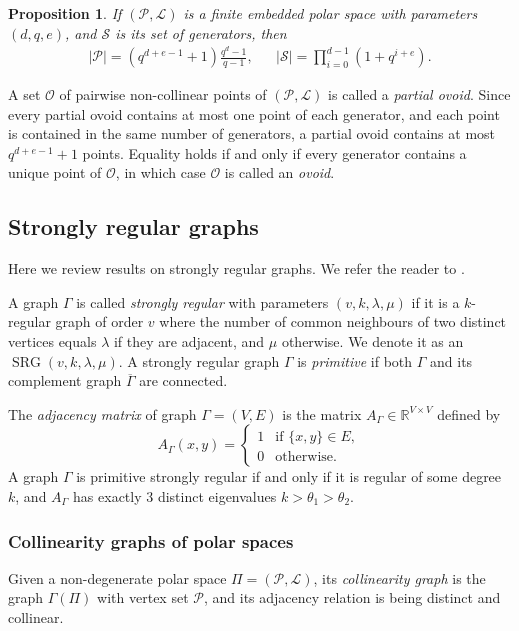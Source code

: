 \documentclass[a4paper]{article}
\newtheorem{prop}[thm]{Proposition}
\theoremstyle{definition}
\newcommand{\RR}{\mathbb R}
\newcommand{\ml}{\mathcal L}
\newcommand{\mo}{\mathcal O}
\renewcommand{\mp}{\mathcal P}
\newcommand{\ms}{\mathcal S}
\DeclareMathOperator{\SRG}{SRG}
\begin{document}
\begin{prop}
 If $(\mp,\ml)$ is a finite embedded polar space with parameters $(d,q,e)$, and $\ms$ is its set of generators, then
 \begin{align*}
  |\mp| = (q^{d+e-1}+1) \frac{q^d - 1}{q-1}, &&
  |\ms| = \prod_{i=0}^{d-1} (1+q^{i+e}).
 \end{align*}
\end{prop}

A set $\mo$ of pairwise non-collinear points of $(\mp,\ml)$ is called a \emph{partial ovoid}.
Since every partial ovoid contains at most one point of each generator, and each point is contained in the same number of generators, a partial ovoid contains at most $q^{d+e-1} + 1$ points.
Equality holds if and only if every generator contains a unique point of $\mo$, in which case $\mo$ is called an \emph{ovoid}.

\subsection{Strongly regular graphs}

Here we review results on strongly regular graphs.
We refer the reader to \cite{Brouwer:VanMaldeghem}.

A graph $\Gamma$ is called \emph{strongly regular} with parameters $(v,k,\lambda,\mu)$ if it is a $k$-regular graph of order $v$ where the number of common neighbours of two distinct vertices equals $\lambda$ if they are adjacent, and $\mu$ otherwise.
We denote it as an $\SRG(v,k,\lambda,\mu)$.
A strongly regular graph $\Gamma$ is \emph{primitive} if both $\Gamma$ and its complement graph $\overline \Gamma$ are connected.

The \emph{adjacency matrix} of graph $\Gamma = (V,E)$ is the matrix $A_\Gamma \in \RR^{V \times V}$ defined by
\[
 A_\Gamma(x,y) = \begin{cases}
  1 & \text{if } \{x,y\} \in E, \\
  0 & \text{otherwise}.
 \end{cases}
\]
A graph $\Gamma$ is primitive strongly regular if and only if it is regular of some degree $k$, and $A_\Gamma$ has exactly 3 distinct eigenvalues $k > \theta_1 > \theta_2$.

\subsubsection{Collinearity graphs of polar spaces}

Given a non-degenerate polar space $\Pi = (\mp,\ml)$, its \emph{collinearity graph} is the graph $\Gamma(\Pi)$ with vertex set $\mp$, and its adjacency relation is being distinct and collinear.
\end{document}
